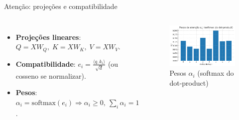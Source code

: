 \documentclass{beamer}
\begin{document}
\begin{frame}{Atenção: projeções e compatibilidade}
\begin{columns}[t]
  \begin{itemize}
    \item \textbf{Projeções lineares}: $Q=XW_Q,\;K=XW_K,\;V=XW_V$.
    \item \textbf{Compatibilidade}: $e_i=\frac{\langle q,k_i\rangle}{\sqrt{d}}$ 
          (ou cosseno se normalizar).
    \item \textbf{Pesos}: $\alpha_i=\mathrm{softmax}(e_i)\Rightarrow \alpha_i\!\ge\!0,\ \sum_i \alpha_i=1$.
  \end{itemize}
  \begin{figure}
	\centering
	\includegraphics[width=\linewidth]{assets/scalar-softmax.png}
	\caption{Pesos $\alpha_i$ (softmax do dot-product)}
	\end{figure}
\end{columns}
\end{frame}
\end{document}
